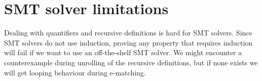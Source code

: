 \documentclass[a4paper]{article}
\begin{document}
\section{SMT solver limitations}
\label{sec:smt-limitations}
Dealing with quantifiers and recursive definitions is hard for SMT solvers.
Since SMT solvers do not use induction, proving any property that requires induction
will fail if we want to use an off-the-shelf SMT solver.
We might encounter a counterexample during unrolling of the recursive definitions,
but if none exists we will get looping behaviour during e-matching.
\end{document}
